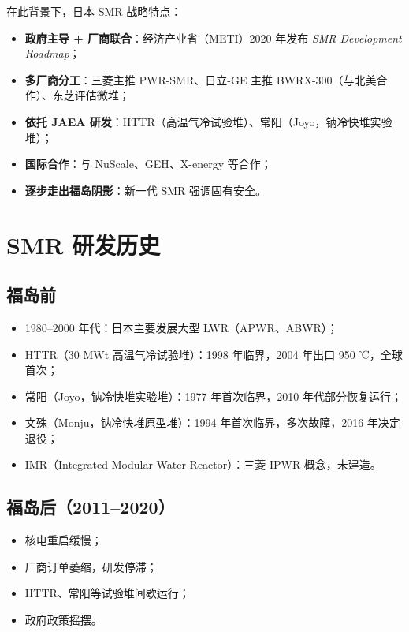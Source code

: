 \documentclass[
  UTF8,
  scheme=plain,
  fontsize=10pt,
  openany
]{ctexbook}
\begin{document}
在此背景下，日本 SMR 战略特点：

\begin{itemize}
\tightlist
\item
  \textbf{政府主导 + 厂商联合}：经济产业省（METI）2020 年发布 \emph{SMR
  Development Roadmap}；
\item
  \textbf{多厂商分工}：三菱主推 PWR-SMR、日立-GE 主推
  BWRX-300（与北美合作）、东芝评估微堆；
\item
  \textbf{依托 JAEA
  研发}：HTTR（高温气冷试验堆）、常阳（Joyo，钠冷快堆实验堆）；
\item
  \textbf{国际合作}：与 NuScale、GEH、X-energy 等合作；
\item
  \textbf{逐步走出福岛阴影}：新一代 SMR 强调固有安全。
\end{itemize}

\section{SMR 研发历史}\label{smr-ux7814ux53d1ux5386ux53f2}

\subsection{福岛前}\label{ux798fux5c9bux524d}

\begin{itemize}
\tightlist
\item
  1980--2000 年代：日本主要发展大型 LWR（APWR、ABWR）；
\item
  HTTR（30 MWt 高温气冷试验堆）：1998 年临界，2004 年出口 950
  ℃，全球首次；
\item
  常阳（Joyo，钠冷快堆实验堆）：1977 年首次临界，2010 年代部分恢复运行；
\item
  文殊（Monju，钠冷快堆原型堆）：1994 年首次临界，多次故障，2016
  年决定退役；
\item
  IMR（Integrated Modular Water Reactor）：三菱 IPWR 概念，未建造。
\end{itemize}

\subsection{福岛后（2011--2020）}\label{ux798fux5c9bux540e20112020}

\begin{itemize}
\tightlist
\item
  核电重启缓慢；
\item
  厂商订单萎缩，研发停滞；
\item
  HTTR、常阳等试验堆间歇运行；
\item
  政府政策摇摆。
\end{itemize}
\end{document}

